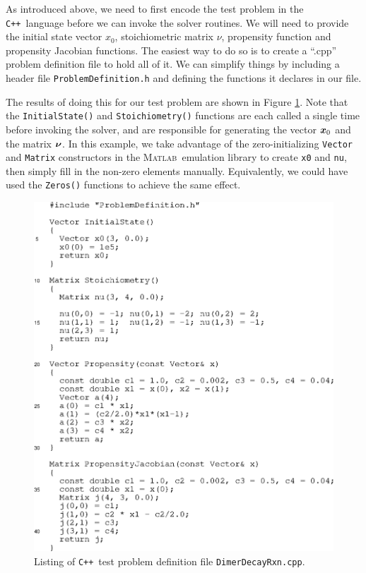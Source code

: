 \documentclass[12pt]{article}
\newcommand{\vctr}[1]{\mbox{\boldmath $#1$}}
\newcommand{\mtrx}[1]{\mbox{\boldmath $#1$}}
\newcommand{\timevec}[2]{\vctr{#1}_{#2}}
\newcommand{\matlab}{\textsc{Matlab}}
\newcommand{\cpp}{\texttt{C++}}%
\newcommand{\api}[1]{\texttt{#1}}
\begin{document}
As introduced above, we need to first encode the test problem in the \cpp\
language before we can invoke the solver routines.  We will need to
provide the initial state vector $x_0$, stoichiometric matrix $\nu$,
propensity function and propensity Jacobian functions. The easiest way to do so is to
create a ``.cpp'' problem definition file to hold all of it.  We can
simplify things by including a header file \api{ProblemDefinition.h} and
defining the functions it declares in our file.

The results of doing this for our test problem are shown in Figure
\ref{testprob_cpp}.  Note that the \api{InitialState()} and
\api{Stoichiometry()} functions are each called a single time before
invoking the solver, and are responsible for generating the vector
$\timevec{x}{0}$ and the matrix $\mtrx{\nu}$.  In this example, we
take advantage of the zero-initializing \api{Vector} and \api{Matrix}
constructors in the \matlab\ emulation library to create \api{x0} and
\api{nu}, then simply fill in the non-zero elements manually.
Equivalently, we could have used the \api{Zeros()} functions to
achieve the same effect.
\begin{figure}[htbp]
  \centering \includegraphics{dimer_decay_cpp.eps}
  \caption{Listing of \cpp\ test problem definition file
           \api{DimerDecayRxn.cpp}.}
  \label{testprob_cpp}
\end{figure}
\end{document}
